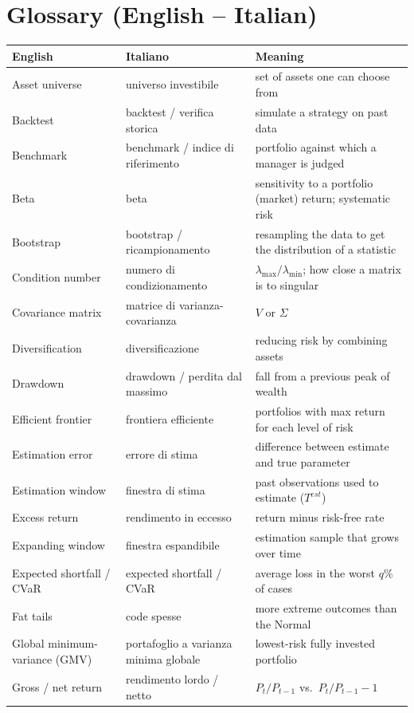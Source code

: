 \documentclass[11pt,a4paper]{report}
\begin{document}
\chapter{Glossary (English -- Italian)}
\label{ch:glossary}
{\small
\begin{longtable}{@{}p{4.2cm}p{4.2cm}p{6.6cm}@{}}
\toprule
English & Italiano & Meaning \\
\midrule
\endhead
Asset universe & universo investibile & set of assets one can choose from \\
Backtest & backtest / verifica storica & simulate a strategy on past data \\
Benchmark & benchmark / indice di riferimento & portfolio against which a manager is judged \\
Beta & beta & sensitivity to a portfolio (market) return; systematic risk \\
Bootstrap & bootstrap / ricampionamento & resampling the data to get the distribution of a statistic \\
Condition number & numero di condizionamento & $\lambda_{\max}/\lambda_{\min}$; how close a matrix is to singular \\
Covariance matrix & matrice di varianza-covarianza & $V$ or $\Sigma$ \\
Diversification & diversificazione & reducing risk by combining assets \\
Drawdown & drawdown / perdita dal massimo & fall from a previous peak of wealth \\
Efficient frontier & frontiera efficiente & portfolios with max return for each level of risk \\
Estimation error & errore di stima & difference between estimate and true parameter \\
Estimation window & finestra di stima & past observations used to estimate ($T^{est}$) \\
Excess return & rendimento in eccesso & return minus risk-free rate \\
Expanding window & finestra espandibile & estimation sample that grows over time \\
Expected shortfall / CVaR & expected shortfall / CVaR & average loss in the worst $q\%$ of cases \\
Fat tails & code spesse & more extreme outcomes than the Normal \\
Global minimum-variance (GMV) & portafoglio a varianza minima globale & lowest-risk fully invested portfolio \\
Gross / net return & rendimento lordo / netto & $P_t/P_{t-1}$ vs.\ $P_t/P_{t-1}-1$ \\

\end{longtable}}
\end{document}
